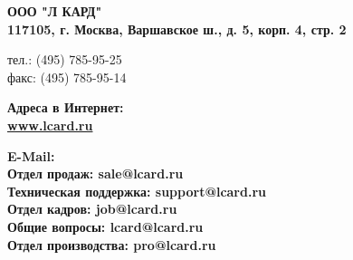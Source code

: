 \documentclass[12pt,a4paper,titlepage]{report}
\begin{document}
  \vspace{5mm}
  
  
  \label{lcard_address}
  \begin{flushleft}
  \bfseries\large ООО "Л КАРД" \\
  {\mdseries\normalsize 117105, г. Москва, Варшавское ш., д. 5, корп. 4, стр. 2 }
  \end{flushleft}
  
  \vspace{2mm}
  
  \begin{flushleft}
  тел.: 	(495) 785-95-25 \\
  факс: 	(495) 785-95-14 \\
  \end{flushleft}
  
  \vspace{2mm}
  
  \begin{flushleft}
  \bfseries\large Адреса в Интернет:  \\
  \mdseries\normalsize \href{http://www.lcard.ru}{www.lcard.ru} \\
  \end{flushleft}
  
  \vspace{2mm}
  
  \begin{flushleft}
  \bfseries\large E-Mail: \\
  \mdseries\normalsize Отдел продаж:           sale@lcard.ru \\ 
  \mdseries\normalsize Техническая поддержка:  support@lcard.ru \\
  \mdseries\normalsize Отдел кадров:           job@lcard.ru \\
  \mdseries\normalsize Общие вопросы:          lcard@lcard.ru \\
  \mdseries\normalsize Отдел производства:     pro@lcard.ru \\
  \end{flushleft}
  
\end{document}
